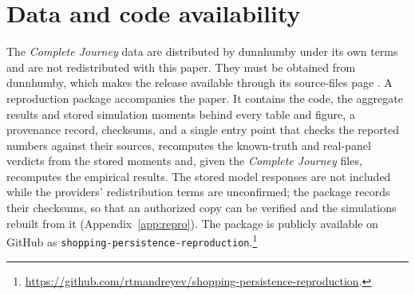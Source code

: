 \documentclass[11pt]{article}
\begin{document}
\section*{Data and code availability}

The \emph{Complete Journey} data are distributed by dunnhumby under its own terms and are not
redistributed with this paper. They must be obtained from dunnhumby, which makes the release
available through its source-files page \citep{dunnhumby}. A reproduction package accompanies
the paper. It contains the code, the aggregate results and stored simulation moments behind
every table and figure, a provenance record, checksums, and a single entry point that
checks the reported numbers against their sources, recomputes the known-truth and real-panel
verdicts from the stored moments and, given the \emph{Complete Journey} files, recomputes the
empirical results. The stored model responses are not included while the providers'
redistribution terms are unconfirmed; the package records their checksums, so that an authorized
copy can be verified and the simulations rebuilt from it (Appendix~\ref{app:repro}). The
package is publicly available on GitHub as \texttt{shopping-persistence-reproduction}.\footnote{%
\url{https://github.com/rtmandreyev/shopping-persistence-reproduction}.}
\end{document}
